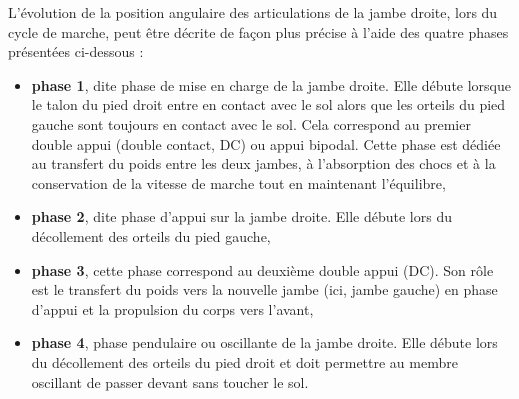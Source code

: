L'évolution de la position angulaire des articulations de la jambe droite,
lors du cycle de marche, peut être décrite de façon plus précise à l'aide des quatre phases présentées ci-dessous :
\begin{itemize}
 \item \textbf{phase 1}, dite phase de mise en charge de la jambe droite. Elle débute lorsque le talon du pied droit entre en contact avec le sol alors que les orteils du pied gauche sont toujours en contact avec le sol. Cela correspond au premier double appui (double contact, DC) ou appui bipodal. Cette phase est dédiée au transfert du poids entre les deux jambes, à l'absorption des chocs et
à la conservation de la vitesse de marche tout en maintenant l'équilibre,
 \item \textbf{phase 2}, dite phase d'appui sur la jambe droite. Elle débute lors du décollement des orteils du pied gauche,
 \item \textbf{phase 3}, cette phase correspond au deuxième double appui (DC). Son rôle est le transfert du poids vers la nouvelle jambe (ici, jambe gauche) en phase d'appui et la propulsion du corps vers l'avant,
 \item \textbf{phase 4}, phase pendulaire ou oscillante de la jambe droite. Elle débute lors du décollement des orteils du pied droit et doit permettre au membre oscillant de passer devant sans toucher le sol.
\end{itemize}

